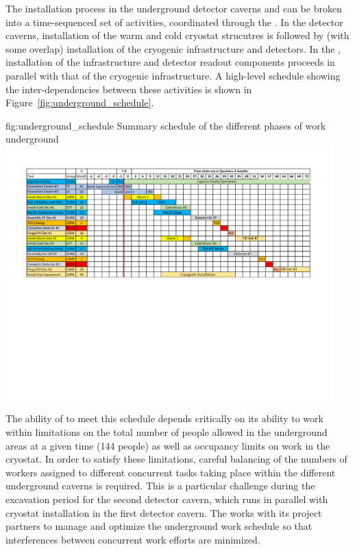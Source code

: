 The installation 
process in the underground detector caverns and  can 
be broken into a time-sequenced set of activities, coordinated 
through the .  In the detector caverns, installation 
of the warm and cold cryostat strucutres is followed by (with 
some overlap) installation of the cryogenic infrastructure and 
detectors.  In the , installation of the   
infrastructure and detector readout components proceeds in 
parallel with that of the cryogenic infrastructure.  A high-level 
schedule showing the inter-dependencies between these activities 
is shown in Figure~\ref{fig:underground_schedule}.
\begin{dunefigure}{fig:underground_schedule}
  {Summary schedule of the different phases of work underground}
  \includegraphics[width=0.95\textwidth]{graphics/Overall_schedule-T0}
\end{dunefigure}

The ability of  to meet this schedule depends
critically on its ability to work within limitations on the total
number of people allowed in the underground areas at a given time
(144 people) as well as occupancy limits on work in the cryostat.  In order
to satisfy these limitations, careful balancing of the numbers of
workers assigned to different concurrent tasks taking place within the
different underground caverns is required.  This is a particular
challenge during the excavation period for the second detector cavern,
which runs in parallel with cryostat installation in the first
detector cavern.  The  works with its  project 
partners to manage and optimize the underground work schedule so that 
interferences between concurrent work efforts are minimized.

